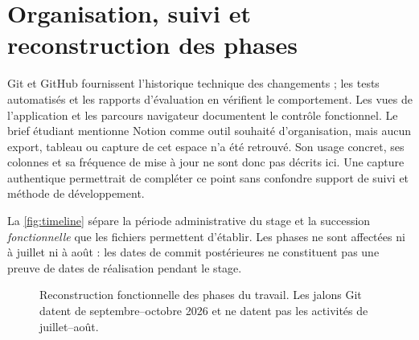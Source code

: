 \section{Organisation, suivi et reconstruction des phases}
Git et GitHub fournissent l'historique technique des changements ; les tests automatisés et les rapports d'évaluation en vérifient le comportement. Les vues de l'application et les parcours navigateur documentent le contrôle fonctionnel. Le brief étudiant mentionne Notion comme outil souhaité d'organisation, mais aucun export, tableau ou capture de cet espace n'a été retrouvé. Son usage concret, ses colonnes et sa fréquence de mise à jour ne sont donc pas décrits ici. Une capture authentique permettrait de compléter ce point sans confondre support de suivi et méthode de développement.

La \autoref{fig:timeline} sépare la période administrative du stage et la succession \emph{fonctionnelle} que les fichiers permettent d'établir. Les phases ne sont affectées ni à juillet ni à août : les dates de commit postérieures ne constituent pas une preuve de dates de réalisation pendant le stage.

\begin{figure}[htbp]\centering
{}
\caption{Reconstruction fonctionnelle des phases du travail. Les jalons Git datent de septembre--octobre 2026 et ne datent pas les activités de juillet--août.}\label{fig:timeline}
\end{figure}

